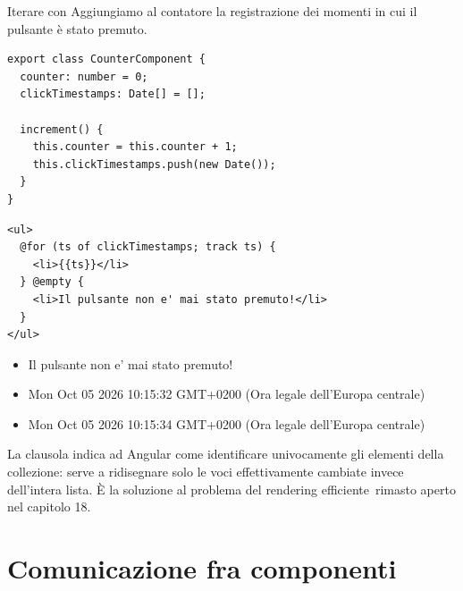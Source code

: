 \begin{esempio}{Iterare con }
Aggiungiamo al contatore la registrazione dei momenti in cui il pulsante è
stato premuto.

\begin{lstlisting}[style=ts, name=counter.component.ts]
export class CounterComponent {
  counter: number = 0;
  clickTimestamps: Date[] = [];

  increment() {
    this.counter = this.counter + 1;
    this.clickTimestamps.push(new Date());
  }
}
\end{lstlisting}

\begin{affianco}[0.4][c]
\codicepiccolo
\begin{lstlisting}[style=html, name=counter.component.html]
<ul>
  @for (ts of clickTimestamps; track ts) {
    <li>{{ts}}</li>
  } @empty {
    <li>Il pulsante non e' mai stato premuto!</li>
  }
</ul>
\end{lstlisting}
\risultato
\begin{browser}
  \begin{itemize}[leftmargin=14pt, itemsep=0pt, topsep=0pt]
    \item Il pulsante non e' mai stato premuto!
  \end{itemize}
\end{browser}
\begin{browser}
  \footnotesize
  \begin{itemize}[leftmargin=14pt, itemsep=0pt, topsep=0pt]
    \item Mon Oct 05 2026 10:15:32 GMT+0200 (Ora legale dell'Europa centrale)
    \item Mon Oct 05 2026 10:15:34 GMT+0200 (Ora legale dell'Europa centrale)
  \end{itemize}
\end{browser}
\end{affianco}

La clausola  indica ad Angular come identificare univocamente gli
elementi della collezione: serve a ridisegnare solo le voci effettivamente
cambiate invece dell'intera lista. È la soluzione al problema del
\guillemotleft rendering efficiente\guillemotright\ rimasto aperto nel capitolo 18.
\end{esempio}

\section{Comunicazione fra componenti}

